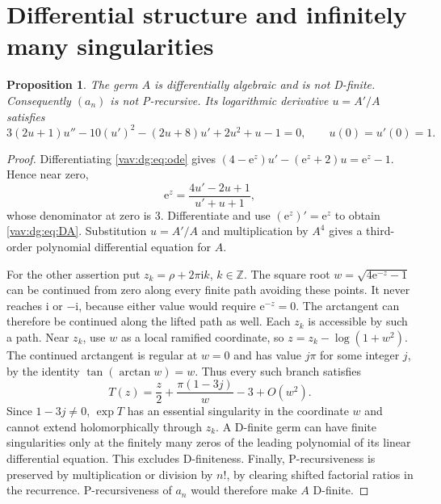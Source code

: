 \documentclass[11pt]{article}
\newtheorem{proposition}[theorem]{Proposition}
\theoremstyle{remark}\newtheorem{remark}[theorem]{Remark}
\newcommand{\ii}{\mathrm i}
\newcommand{\ee}{\mathrm e}
\begin{document}
\section{Differential structure and infinitely many singularities}\label{vav:dg:sec:structure}
\begin{proposition}\label{vav:dg:prop:structure}
The germ $A$ is differentially algebraic and is not D-finite.
Consequently $(a_n)$ is not P-recursive.
Its logarithmic derivative $u=A'/A$ satisfies
\begin{equation}\label{vav:dg:eq:DA}
 3(2u+1)u''-10(u')^2-(2u+8)u'+2u^2+u-1=0,
 \qquad u(0)=u'(0)=1.
\end{equation}
\end{proposition}
\begin{proof}
Differentiating \eqref{vav:dg:eq:ode} gives
$(4-\ee^z)u'-(\ee^z+2)u=\ee^z-1$. Hence near zero,
\[
 \ee^z=\frac{4u'-2u+1}{u'+u+1},
\]
whose denominator at zero is $3$. Differentiate and use
$(\ee^z)'=\ee^z$ to obtain \eqref{vav:dg:eq:DA}.
Substitution $u=A'/A$ and multiplication by $A^4$ gives a third-order
polynomial differential equation for $A$.

For the other assertion put $z_k=\rho+2\pi\ii k$, $k\in\mathbb Z$.
The square root $w=\sqrt{4\ee^{-z}-1}$ can be continued from zero
along every finite path avoiding these points.
It never reaches $\ii$ or $-\ii$, because either value would require
$\ee^{-z}=0$. The arctangent can therefore be continued along the
lifted path as well. Each $z_k$ is accessible by such a path.
Near $z_k$, use $w$ as a local ramified coordinate, so
$z=z_k-\log(1+w^2)$.
The continued arctangent is regular at $w=0$ and has value $j\pi$
for some integer $j$, by the identity $\tan(\arctan w)=w$.
Thus every such branch satisfies
\[
 T(z)=\frac z2+\frac{\pi(1-3j)}{w}-3+O(w^2).
\]
Since $1-3j\ne0$, $\exp T$ has an essential singularity in the
coordinate $w$ and cannot extend holomorphically through $z_k$.
A D-finite germ can have finite singularities only at the finitely
many zeros of the leading polynomial of its linear differential
equation. This excludes D-finiteness.
Finally, P-recursiveness is preserved by multiplication or division
by $n!$, by clearing shifted factorial ratios in the recurrence.
P-recursiveness of $a_n$ would therefore make $A$ D-finite.
\end{proof}
\end{document}
